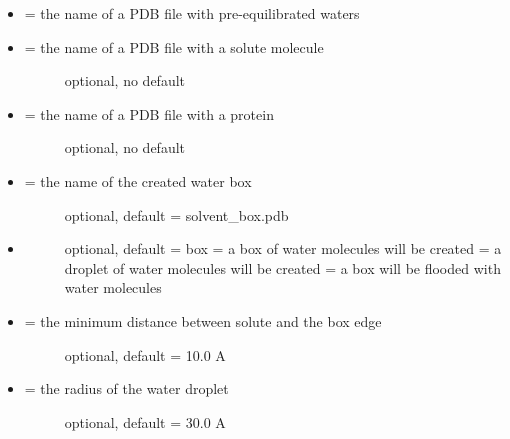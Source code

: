 \documentclass[letterpaper,10pt,english]{manual}
\begin{document}
\begin{itemize}
\item {} 
 = the name of a PDB file with pre-equilibrated waters

\item {} \begin{description}
\item[{ = the name of a PDB file with a solute molecule}] \leavevmode
optional, no default

\end{description}

\item {} \begin{description}
\item[{ = the name of a PDB file with a protein}] \leavevmode
optional, no default

\end{description}

\item {} \begin{description}
\item[{ = the name of the created water box}] \leavevmode
optional, default = solvent\_box.pdb

\end{description}

\item {} \begin{description}
\item[{}] \leavevmode
optional, default = box
 = a box of water molecules will be created
 = a droplet of water molecules will be created
 = a box will be flooded with water molecules

\end{description}

\item {} \begin{description}
\item[{ = the minimum distance between solute and the box edge}] \leavevmode
optional, default = 10.0 A

\end{description}

\item {} \begin{description}
\item[{ = the radius of the water droplet}] \leavevmode
optional, default = 30.0 A


\end{description}
\end{itemize}
\end{document}
